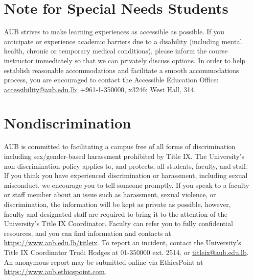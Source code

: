 \documentclass[10pt,a4paper,american]{exam}
\begin{document}
\section{Note for Special Needs Students}
AUB strives to make learning experiences as accessible as possible. If you anticipate or experience academic barriers due to a disability (including mental health, chronic or temporary medical conditions), please inform the course instructor immediately so that we can privately discuss options. In order to help establish reasonable accommodations and facilitate a smooth accommodations process, you are encouraged to contact the Accessible Education Office: \href{mailto:accessibility@aub.edu.lb}{accessibility@aub.edu.lb}; +961-1-350000, x3246; West Hall, 314.

\section{Nondiscrimination}
AUB is committed to facilitating a campus free of all forms of discrimination including sex/gender-based harassment prohibited by Title IX. The University's non-discrimination policy applies to, and protects, all students, faculty, and staff. If you think you have experienced discrimination or harassment, including sexual misconduct, we encourage you to tell someone promptly. If you speak to a faculty or staff member about an issue such as harassment, sexual violence, or discrimination, the information will be kept as private as possible, however, faculty and designated staff are required to bring it to the attention of the University's Title IX Coordinator. Faculty can refer you to fully confidential resources, and you can find information and contacts at \url{https://www.aub.edu.lb/titleix}. To report an incident, contact the University's Title IX Coordinator Trudi Hodges at 01-350000 ext. 2514, or
\href{mailto:titleix@aub.edu.lb}{titleix@aub.edu.lb}. An anonymous report may be submitted online via EthicsPoint at \url{https://www.aub.ethicspoint.com}.
\end{document}
